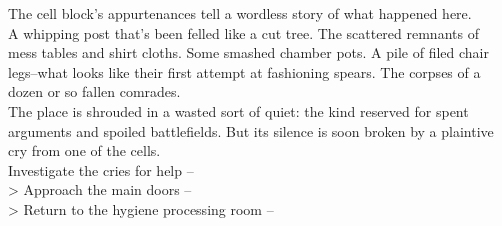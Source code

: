 The cell block’s appurtenances tell a wordless story of what happened here.\\

A whipping post that’s been felled like a cut tree. The scattered remnants of mess tables and shirt cloths. Some smashed chamber pots. A pile of filed chair legs--what looks like their first attempt at fashioning spears. The corpses of a dozen or so fallen comrades.\\

The place is shrouded in a wasted sort of quiet: the kind reserved for spent arguments and spoiled battlefields. But its silence is soon broken by a plaintive cry from one of the cells.\\

 Investigate the cries for help -- \\
> Approach the main doors -- \\
> Return to the hygiene processing room -- 